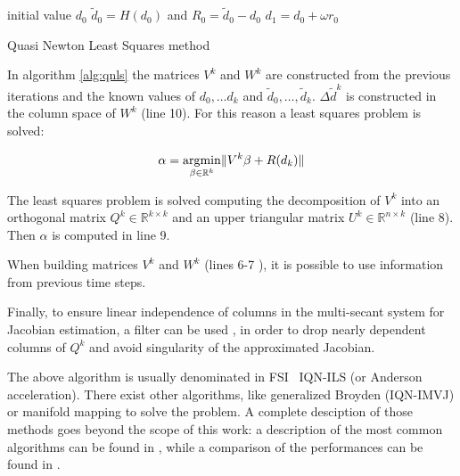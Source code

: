 \begin{algorithm}[H]
	\SetAlgoLined
	initial value $d_0$\;
	$\tilde{d}_0 = H(d_0)$ and $R_0 = \tilde{d}_0 - d_0$\;
	$d_1 = d_0 + \omega r_0$\;
	\label{alg:qnls}
	\caption{Quasi Newton Least Squares method}
\end{algorithm}

In algorithm \ref{alg:qnls} the matrices $V^k$ and $W^k$ are constructed from the previous iterations and the known values of $d_0, \ldots d_k$ and $\tilde{d}_0, \ldots, \tilde{d}_k$. $\Delta \tilde{d}^k$ is constructed in the column space of $W^k$ (line 10). For this reason a least squares problem is solved:

\begin{equation}
	\alpha = \operatorname*{argmin}_{\beta \in \mathbb{R}^k} \lVert V^k\beta + R(d_k) \rVert
\end{equation}

The least squares problem is solved  computing the decomposition of $V^k$ into an orthogonal matrix $Q^k \in \mathbb{R}^{k \times k} $ and an upper triangular matrix $U^k \in \mathbb{R}^{n \times k}$ (line 8). Then $\alpha$ is computed in line 9.

When building matrices $V^k$ and $W^k$ (lines 6-7 ), it is possible to use information from previous time steps.

Finally, to ensure linear independence of columns in the multi-secant system for Jacobian estimation, a filter can be used \cite{haelterman2016improving}, in order to drop nearly dependent columns of $Q^k$ and avoid singularity of the approximated Jacobian.

The above algorithm is usually denominated in FSI  ~\ac{IQN-ILS} (or Anderson acceleration). There exist other algorithms, like generalized Broyden (IQN-IMVJ) or manifold mapping to solve the problem. A complete desciption of those methods goes beyond the scope of this work: a description of the most common algorithms can be found in \cite{blom2016review}, while a comparison of the performances can be found in \cite{lindner2015comparison}.


